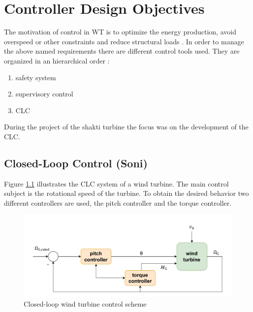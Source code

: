 \chapter{Controller Design Objectives}
The motivation of control in \gls{WT} is to optimize the energy production, avoid overspeed or other constraints and reduce structural loads \cite{SchlipfLecture}.
In order to manage the above named requirements there are different control tools used.
They are organized in an hierarchical order \cite{WindEnergyHandbook}:
\begin{enumerate} 
	\item safety system
	\item supervisory control
	\item \gls{CLC}
\end{enumerate} 
During the project of the \gls{shakti} turbine the focus was on the development of the \gls{CLC}.
\section{Closed-Loop Control (Soni)} \label{Advanced controller}
Figure \ref{fig:Closed-loop Wind Turbine Control} illustrates the \gls{CLC} system of a wind turbine.
The main control subject is the rotational speed of the turbine.
To obtain the desired behavior two different controllers are used, the pitch controller and the torque controller.

\begin{figure}[h]
	\centering
	\includegraphics[width=\textwidth]{Figures/Control_loop}
	\caption{Closed-loop wind turbine control scheme}
	\label{fig:Closed-loop Wind Turbine Control}
\end{figure}

